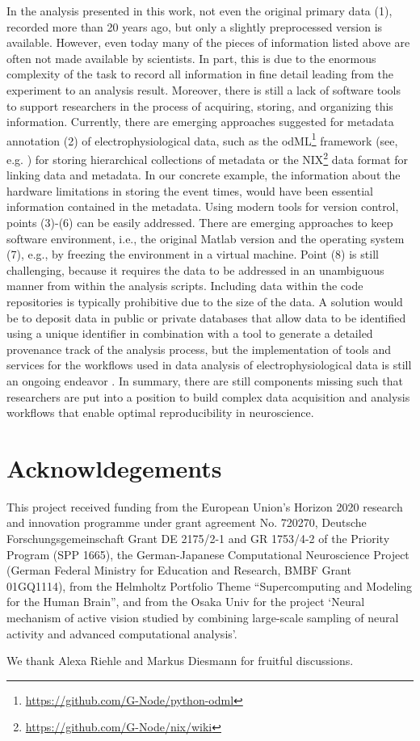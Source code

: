\documentclass[10pt,a4paper,onecolumn]{article}
\begin{document}
In the analysis presented in this work, not even the original primary
data (1), recorded more than 20 years ago, but only a slightly
preprocessed version is available. However, even today many of the
pieces of information listed above are often not made available by
scientists. In part, this is due to the enormous complexity of the task
to record all information in fine detail leading from the experiment to
an analysis result. Moreover, there is still a lack of software tools to
support researchers in the process of acquiring, storing, and organizing
this information. Currently, there are emerging approaches suggested for
metadata annotation (2) of electrophysiological data, such as the
odML\footnote{\url{https://github.com/G-Node/python-odml}} framework
(see, e.g. \autocites{Grewe2011}{Zehl2016}) for storing hierarchical
collections of metadata or the NIX\footnote{\url{https://github.com/G-Node/nix/wiki}}
data format \autocite{Adrian2014} for linking data and metadata. In our
concrete example, the information about the hardware limitations in
storing the event times, would have been essential information contained
in the metadata. Using modern tools for version control, points (3)-(6)
can be easily addressed. There are emerging approaches to keep software
environment, i.e., the original Matlab version and the operating system
(7), e.g., by freezing the environment in a virtual machine. Point (8)
is still challenging, because it requires the data to be addressed in an
unambiguous manner from within the analysis scripts. Including data
within the code repositories is typically prohibitive due to the size of
the data. A solution would be to deposit data in public or private
databases that allow data to be identified using a unique identifier in
combination with a tool to generate a detailed provenance track of the
analysis process, but the implementation of tools and services for the
workflows used in data analysis of electrophysiological data is still an
ongoing endeavor \autocites{badia_incf_2015}{Denker2015_000}. In
summary, there are still components missing such that researchers are
put into a position to build complex data acquisition and analysis
workflows that enable optimal reproducibility in neuroscience.

\section{Acknowldegements}\label{acknowldegements}

This project received funding from the European Union's Horizon 2020
research and innovation programme under grant agreement No. 720270,
Deutsche Forschungsgemeinschaft Grant DE 2175/2-1 and GR 1753/4-2 of the
Priority Program (SPP 1665), the German-Japanese Computational
Neuroscience Project (German Federal Ministry for Education and
Research, BMBF Grant 01GQ1114), from the Helmholtz Portfolio Theme
``Supercomputing and Modeling for the Human Brain'', and from the Osaka
Univ for the project `Neural mechanism of active vision studied by
combining large-scale sampling of neural activity and advanced
computational analysis'.

We thank Alexa Riehle and Markus Diesmann for fruitful discussions.

{\sffamily \small
  \printbibliography[title=References]
}
\end{document}
